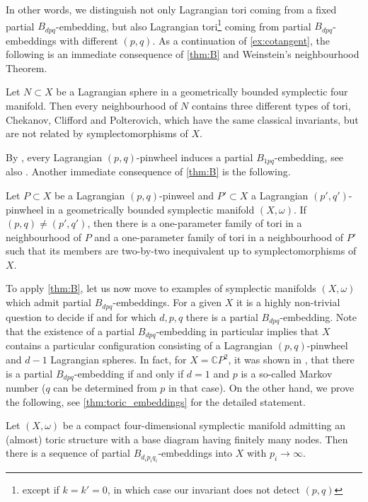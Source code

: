 \documentclass[12pt,a4paper,abstract=true,draft]{scrartcl}
\begin{document}
In other words, we distinguish not only Lagrangian tori coming from a fixed partial $B_{dpq}$-embedding, but also Lagrangian tori\footnote{except if $k=k'=0$, in which case our invariant does not detect $(p,q)$} coming from partial $B_{dpq}$-embeddings with different $(p,q)$.
As a continuation of \cref{ex:cotangent}, the following is an immediate consequence of \cref{thm:B} and Weinstein's neighbourhood Theorem.

\begin{corollary}
    \label{thm:lag_sphere}
    Let $N \subset X$ be a Lagrangian sphere in a geometrically bounded symplectic four manifold.
    Then every neighbourhood of $N$ contains three different types of tori, Chekanov, Clifford and Polterovich, which have the same classical invariants, but are not related by symplectomorphisms of $X$.
\end{corollary}

By \cite{Kho13}, every Lagrangian $(p,q)$-pinwheel induces a partial $B_{1pq}$-embedding, see also \cite[Definition 2.10]{EvaSmi18}.
Another immediate consequence of \cref{thm:B} is the following.

\begin{corollary}
    Let $P \subset X$ be a Lagrangian $(p,q)$-pinweel and $P' \subset X$ a Lagrangian $(p',q')$-pinwheel in a geometrically bounded symplectic manifold $(X,\omega)$.
    If $(p,q) ≠ (p',q')$, then there is a one-parameter family of tori in a neighbourhood of $P$ and a one-parameter family of tori in a neighbourhood of $P'$ such that its members are two-by-two inequivalent up to symplectomorphisms of $X$.
\end{corollary}

To apply \cref{thm:B}, let us now move to examples of symplectic manifolds $(X,\omega)$ which admit partial $B_{dpq}$-embeddings.
For a given $X$ it is a highly non-trivial question to decide if and for which $d,p,q$ there is a partial $B_{dpq}$-embedding.
Note that the existence of a partial $B_{dpq}$-embedding in particular implies that $X$ contains a particular configuration consisting of a Lagrangian $(p,q)$-pinwheel and $d-1$ Lagrangian spheres.
In fact, for $X = \mathbb{C}P^2$, it was shown in \cite{EvaSmi18}, that there is a partial $B_{dpq}$-embedding if and only if $d=1$ and $p$ is a so-called Markov number ($q$ can be determined from $p$ in that case).
On the other hand, we prove the following, see \cref{thm:toric_embeddings} for the detailed statement.

\begin{proposition}
    \label{thm:intro_stretch}
  Let $(X,\omega)$ be a compact four-dimensional symplectic manifold admitting an (almost) toric structure with a base diagram having finitely many nodes.
Then there is a sequence of partial $B_{d_i p_i q_i}$-embeddings into $X$ with $p_i \rightarrow \infty$. 
\end{proposition}
\end{document}
